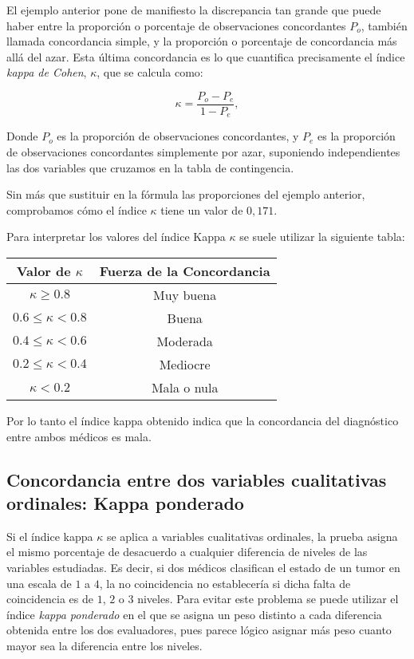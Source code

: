 El ejemplo anterior pone de manifiesto la discrepancia tan grande que puede haber entre la proporción o porcentaje de observaciones
concordantes $P_o$, también llamada concordancia simple, y la proporción o porcentaje de concordancia más allá del azar. Esta última concordancia es lo que cuantifica precisamente el índice \emph{kappa de Cohen}, $\kappa$, que se calcula como:

\[
\kappa  = \frac{P_{o}-P_{e}}{1-P_{e}},
\]

Donde $P_{o}$ es la proporción de observaciones concordantes, y $P_{e}$ es la proporción de observaciones concordantes simplemente por azar,
 suponiendo independientes las dos variables que cruzamos en la tabla de contingencia.

Sin más que sustituir en la fórmula las proporciones del ejemplo anterior, comprobamos cómo el índice  $\kappa$ tiene un valor de
 $0,171$.


Para interpretar los valores del índice Kappa $\kappa$ se suele utilizar la siguiente tabla:
\begin{center}
\begin{tabular}{|c|c|}
\hline
Valor de $\kappa$ & Fuerza de la Concordancia \\
\hline\hline
$\kappa \geq 0.8$ & Muy buena\\
\hline
$0.6\leq\kappa<0.8$ & Buena\\
\hline
$0.4\leq\kappa<0.6$ & Moderada\\
\hline
$0.2\leq\kappa<0.4$ & Mediocre  \\
\hline
$\kappa<0.2$ & Mala o nula  \\
\hline
\end{tabular}
\end{center}

Por lo tanto el índice kappa obtenido indica que la concordancia del diagnóstico entre ambos médicos es mala.


\subsection{Concordancia entre dos variables cualitativas ordinales: Kappa ponderado}
Si el índice kappa $\kappa$ se aplica a variables cualitativas ordinales, la prueba asigna el mismo porcentaje de desacuerdo a cualquier
 diferencia de niveles de las variables estudiadas. Es decir, si dos médicos clasifican el estado de un tumor en una escala de $1$ a $4$, la
no coincidencia no establecería si dicha falta de coincidencia es de $1$, $2$ o $3$ niveles. Para evitar este problema se puede utilizar el
índice \emph{kappa ponderado} en el que se asigna un peso distinto a cada diferencia obtenida entre los dos evaluadores, pues parece lógico asignar
 más peso cuanto mayor sea la diferencia entre los niveles.

